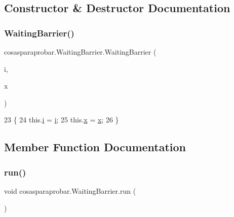 \subsection{Constructor \& Destructor Documentation}
\mbox{\label{classcosasparaprobar_1_1_waiting_barrier_a0914ceff2faf3ab517feecd074549789}} 
\subsubsection{\texorpdfstring{Waiting\+Barrier()}{WaitingBarrier()}}
{\footnotesize\ttfamily cosasparaprobar.\+Waiting\+Barrier.\+Waiting\+Barrier (\begin{DoxyParamCaption}\item[{int}]{i,  }\item[{Cyclic\+Barrier}]{x }\end{DoxyParamCaption})\hspace{0.3cm}{\ttfamily [inline]}}


\begin{DoxyCode}
23     \{
24         this.\mbox{\hyperlink{classcosasparaprobar_1_1_waiting_barrier_a6549abdaae9647b2134980d403273773}{i}} = \mbox{\hyperlink{classcosasparaprobar_1_1_waiting_barrier_a6549abdaae9647b2134980d403273773}{i}};
25         this.\mbox{\hyperlink{classcosasparaprobar_1_1_waiting_barrier_ac29649ee49c77a7acdd5598806a0c097}{x}} = \mbox{\hyperlink{classcosasparaprobar_1_1_waiting_barrier_ac29649ee49c77a7acdd5598806a0c097}{x}};
26     \}
\end{DoxyCode}


\subsection{Member Function Documentation}
\mbox{\label{classcosasparaprobar_1_1_waiting_barrier_a8bd7e01bc5d2cf7a34f6c97ca9cea646}} 
\subsubsection{\texorpdfstring{run()}{run()}}
{\footnotesize\ttfamily void cosasparaprobar.\+Waiting\+Barrier.\+run (\begin{DoxyParamCaption}{ }\end{DoxyParamCaption})\hspace{0.3cm}{\ttfamily [inline]}}


